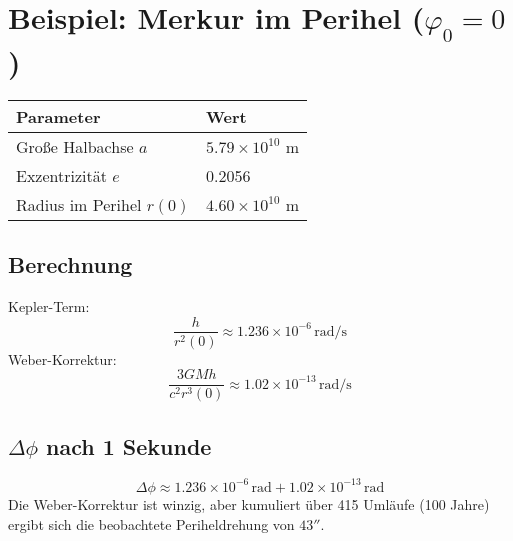 \section{Beispiel: Merkur im Perihel ($\varphi_0 = 0$)}
\begin{table}[h]
\centering
\begin{tabular}{|l|l|}
\hline
\textbf{Parameter} & \textbf{Wert} \\ \hline
Große Halbachse $a$ & $5.79 \times 10^{10}$ m \\ \hline
Exzentrizität $e$ & 0.2056 \\ \hline
Radius im Perihel $r(0)$ & $4.60 \times 10^{10}$ m \\ \hline
\end{tabular}
\end{table}

\subsection{Berechnung}
Kepler-Term:
\[
\frac{h}{r^2(0)} \approx 1.236 \times 10^{-6}\,\text{rad/s}
\]
Weber-Korrektur:
\[
\frac{3GMh}{c^2 r^3(0)} \approx 1.02 \times 10^{-13}\,\text{rad/s}
\]

\subsection{$\Delta\phi$ nach 1 Sekunde}
\[
\Delta \phi \approx 1.236 \times 10^{-6}\,\text{rad} + 1.02 \times 10^{-13}\,\text{rad}
\]
Die Weber-Korrektur ist winzig, aber kumuliert über 415 Umläufe (100 Jahre) ergibt sich die beobachtete Periheldrehung von $43''$.